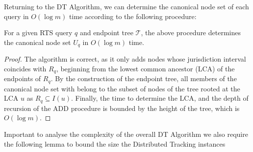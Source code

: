 Returning to the DT Algorithm, we can determine the canonical node set of each query in $O(\log m)$ time according to the following procedure: 

\begin{algorithm}\label{alg:get-canonical-node-set}
\begin{algorithmic}[1]
\State {}
\State {}
\State {}
\State{}
\EndProcedure
\State
{}
\State \text{If $I(u)\subseteq[x,y)$ add $u$ to $U_q$ and \textbf{return}}
\State \text{Else if $I(u)\cap [x,y) = \emptyset$ \textbf{return}}
\State {}
\EndProcedure
\end{algorithmic}
\end{algorithm}

\begin{lemma}
    For a given RTS query $q$ and endpoint tree $\mathcal{T}$, the above procedure determines the canonical node set $U_q$ in $O(\log m)$ time.
\end{lemma}
\begin{proof} The algorithm is correct, as it only adds nodes whose jurisdiction interval coincides with $R_q$, beginning from the lowest common ancestor (LCA) of the endpoints of $R_q$. By the construction of the endpoint tree, all members of the canonical node set with belong to the subset of nodes of the tree rooted at the LCA $u$ as  $R_q\subseteq I(u)$. Finally, the time to determine the LCA, and the depth of recursion of the ADD procedure is bounded by the height of the tree, which is $O(\log m)$.
\end{proof}

Important to analyse the complexity of the overall DT Algorithm we also require the following lemma to bound the size the Distributed Tracking instances

